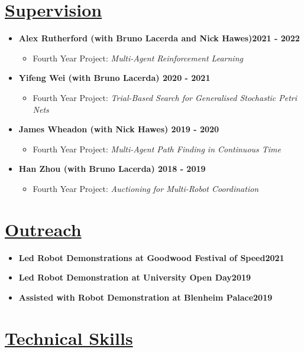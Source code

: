 \documentclass[11pt]{article}
\begin{document}
\section*{\underline{Supervision}}
\begin{itemize}
\item \textbf{Alex Rutherford (with Bruno Lacerda and Nick Hawes)\hfill 2021 - 2022}
\begin{itemize}
\item Fourth Year Project: \emph{Multi-Agent Reinforcement Learning}
\end{itemize}
\item \textbf{Yifeng Wei (with Bruno Lacerda) \hfill 2020 - 2021}
\begin{itemize}
\item Fourth Year Project: \emph{Trial-Based Search for Generalised Stochastic Petri Nets}
\end{itemize} 
\item \textbf{James Wheadon (with Nick Hawes) \hfill 2019 - 2020}
\begin{itemize}
\item  Fourth Year Project: \emph{Multi-Agent Path Finding in Continuous Time}
\end{itemize}
\item \textbf{Han Zhou (with Bruno Lacerda) \hfill 2018 - 2019}
\begin{itemize}
\item Fourth Year Project: \emph{Auctioning for Multi-Robot Coordination}
\end{itemize}
\end{itemize}
	
\section*{\underline{Outreach}}
\begin{itemize}
\item \textbf{Led Robot Demonstrations at Goodwood Festival of Speed\hfill 2021}
\item \textbf{Led Robot Demonstration at University Open Day\hfill 2019}
\item \textbf{Assisted with Robot Demonstration at Blenheim Palace\hfill 2019}
\end{itemize}

\iffalse
	\section*{\underline{Technical Skills}}
\end{document}
